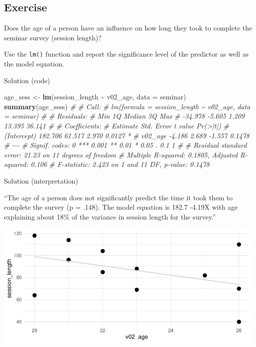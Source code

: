 \documentclass[
]{book}
\newenvironment{Shaded}{\begin{snugshade}}{\end{snugshade}}
\newcommand{\AttributeTok}[1]{\textcolor[rgb]{0.13,0.29,0.53}{#1}}
\newcommand{\CommentTok}[1]{\textcolor[rgb]{0.56,0.35,0.01}{\textit{#1}}}
\newcommand{\FunctionTok}[1]{\textcolor[rgb]{0.13,0.29,0.53}{\textbf{#1}}}
\newcommand{\NormalTok}[1]{#1}
\newcommand{\OtherTok}[1]{\textcolor[rgb]{0.56,0.35,0.01}{#1}}
\newcommand{\SpecialCharTok}[1]{\textcolor[rgb]{0.81,0.36,0.00}{\textbf{#1}}}
\begin{document}
\subsection{\texorpdfstring{Exercise }{Exercise  }}\label{exercise-6}

Does the age of a person have an influence on how long they took to complete the seminar survey (session length)?

Use the \texttt{lm()} function and report the significance level of the predictor as well as the model equation.

Solution (code)

\begin{Shaded}
\begin{Highlighting}[]
\NormalTok{age\_sess }\OtherTok{\textless{}{-}} \FunctionTok{lm}\NormalTok{(session\_length }\SpecialCharTok{\textasciitilde{}}\NormalTok{ v02\_age, }\AttributeTok{data =}\NormalTok{ seminar)}
\FunctionTok{summary}\NormalTok{(age\_sess)}
\CommentTok{\# }
\CommentTok{\# Call:}
\CommentTok{\# lm(formula = session\_length \textasciitilde{} v02\_age, data = seminar)}
\CommentTok{\# }
\CommentTok{\# Residuals:}
\CommentTok{\#     Min      1Q  Median      3Q     Max }
\CommentTok{\# {-}34.978  {-}5.605   1.209  13.395  36.141 }
\CommentTok{\# }
\CommentTok{\# Coefficients:}
\CommentTok{\#             Estimate Std. Error t value Pr(\textgreater{}|t|)  }
\CommentTok{\# (Intercept)  182.706     61.517   2.970   0.0127 *}
\CommentTok{\# v02\_age       {-}4.186      2.689  {-}1.557   0.1478  }
\CommentTok{\# {-}{-}{-}}
\CommentTok{\# Signif. codes:  0 \textquotesingle{}***\textquotesingle{} 0.001 \textquotesingle{}**\textquotesingle{} 0.01 \textquotesingle{}*\textquotesingle{} 0.05 \textquotesingle{}.\textquotesingle{} 0.1 \textquotesingle{} \textquotesingle{} 1}
\CommentTok{\# }
\CommentTok{\# Residual standard error: 21.23 on 11 degrees of freedom}
\CommentTok{\# Multiple R{-}squared:  0.1805,  Adjusted R{-}squared:  0.106 }
\CommentTok{\# F{-}statistic: 2.423 on 1 and 11 DF,  p{-}value: 0.1478}
\end{Highlighting}
\end{Shaded}

Solution (interpretation)

``The age of a person does not significantly predict the time it took them to complete the survey (p = .148). The model equation is 182.7 -4.19X with age explaining about 18\% of the variance in session length for the survey.''

\includegraphics{_main_files/figure-html/age-sess-1.pdf}
\end{document}

